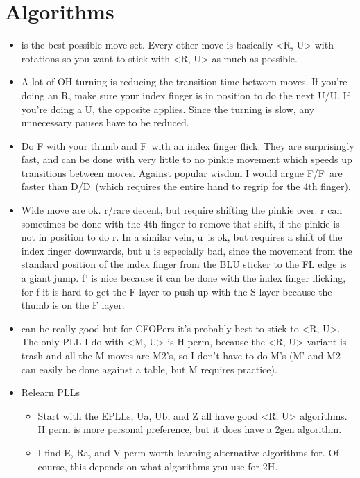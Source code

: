 \documentclass[11pt, oneside]{article}
\newcommand{\dash}{\textquotesingle}
\begin{document}
\section{Algorithms}
\begin{itemize}
  \item <R, U> is the best possible move set. Every other move is basically
    <R, U> with rotations so you want to stick with <R, U> as much as possible.
  \item A lot of OH turning is reducing the transition time between moves.
    If you're doing an R, make sure your index finger is in position to do the
    next U/U\dash. If you're doing a U, the opposite applies. Since the turning
    is slow, any unnecessary pauses have to be reduced.
  \item Do F with your thumb and F\dash\ with an index finger flick.
    They are surprisingly fast, and can be done with very little to no
    pinkie movement which speeds up transitions between moves. 
    Against popular wisdom I would argue F/F\dash\ are faster than D/D\dash\
    (which requires the entire hand to regrip for the 4th finger).
  \item Wide move are ok. r/r\dash are decent, but require shifting the pinkie
    over. r can sometimes be done with the 4th finger to remove that shift,
    if the pinkie is not in position to do r. In a similar vein, u\dash\ is ok,
    but requires a shift of the index finger downwards, but u is especially bad,
    since the movement from the standard position of the index finger from the
    BLU sticker to the FL edge is a giant jump. f' is nice because it can
    be done with the index finger flicking, for f it is hard to get the F layer
    to push up with the S layer because the thumb is on the F layer. 
  \item <M, U> can be really good but for CFOPers it's probably best to stick
    to <R, U>. The only PLL I do with <M, U> is H-perm, because the <R, U>
    variant is trash and all the M moves are M2's, so I don't have to do M's
    (M' and M2 can easily be done against a table, but M requires practice).
  \item Relearn PLLs
    \begin{itemize}
      \item Start with the EPLLs, Ua, Ub, and Z all have good <R, U> algorithms.
        H perm is more personal preference, but it does have a 2gen algorithm.
      \item I find E, Ra, and V perm worth learning alternative algorithms for.
        Of course, this depends on what algorithms you use for 2H.

\end{itemize}
\end{itemize}
\end{document}
